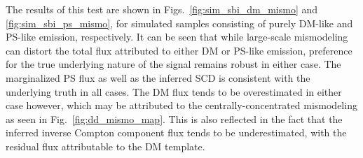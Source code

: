 \documentclass[prd,aps,10pt,nofootinbib,twocolumn,superscriptaddress,preprintnumbers,balancelastpage,longbibliography]{revtex4-1}
\begin{document}
The results of this test are shown in Figs.~\ref{fig:sim_sbi_dm_mismo} and \ref{fig:sim_sbi_ps_mismo}, for simulated samples consisting of purely DM-like and PS-like emission, respectively. It can be seen that while large-scale mismodeling can distort the total flux attributed to either DM or PS-like emission, preference for the true underlying nature of the signal remains robust in either case. The marginalized PS flux as well as the inferred SCD is consistent with the underlying truth in all cases. The DM flux tends to be overestimated in either case however, which may be attributed to the centrally-concentrated mismodeling as seen in Fig.~\ref{fig:dd_mismo_map}. This is also reflected in the fact that the inferred inverse Compton component flux tends to be underestimated, with the residual flux attributable to the DM template.  

\end{document}
